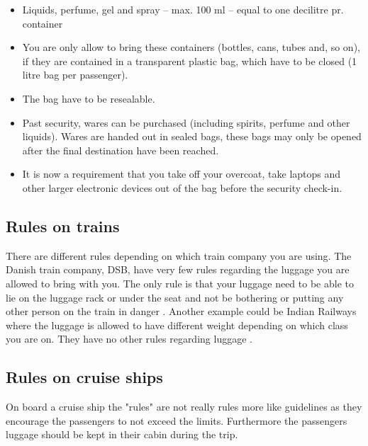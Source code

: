 \begin{itemize}
\item Liquids, perfume, gel and spray – max. 100 ml – equal to one decilitre pr. container
\item You are only allow to bring these containers (bottles, cans, tubes and, so on), if they are contained in a transparent plastic bag, which have to be closed (1 litre bag per passenger).
\item The bag have to be resealable.
\item Past security, wares can be purchased (including spirits, perfume and other liquids). Wares are handed out in sealed bags, these bags may only be opened after the final destination have been reached.
\item It is now a requirement that you take off your overcoat, take laptops and other larger electronic devices out of the bag before the security check-in.\\
\citep{Prohibited_luggage}
\end{itemize}

\subsection{Rules on trains}

There are different rules depending on which train company you are using. 
\newline
The Danish train company, DSB, have very few rules regarding the luggage you are allowed to bring with you. 
\newline\newline
The only rule is that your luggage need to be able to lie on the luggage rack or under the seat and not be bothering or putting any other person on the train in danger \citep{rulestrain}.
\newline\newline
Another example could be Indian Railways where the luggage is allowed to have different weight depending on which class you are on. They have no other rules regarding luggage \citep{idianrules}.

\subsection{Rules on cruise ships}
On board a cruise ship the "rules" are not really rules more like guidelines as they encourage the passengers to not exceed the limits. Furthermore the passengers luggage should be kept in their cabin during the trip\citep{Cruise}.

